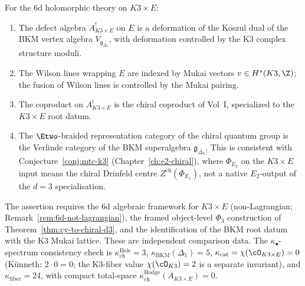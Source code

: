 \begin{conjecture}
\label{conj:chiral-qg-k3xe}
\ClaimStatusConjectured
For the 6d holomorphic theory on $K3 \times E$:
\begin{enumerate}[label=\textup{(\roman*)}]
 \item The defect algebra $A^!_{K3 \times E}$ on $E$ is a deformation of the Koszul dual of the BKM vertex algebra $V_{\mathfrak{g}_{\Delta_5}}$, with deformation controlled by the K3 complex structure moduli.
 \item The Wilson lines wrapping $E$ are indexed by Mukai vectors $v \in H^*(K3, \Z)$; the fusion of Wilson lines is controlled by the Mukai pairing.
 \item The coproduct on $A^!_{K3 \times E}$ is the chiral coproduct of Vol~I, specialized to the $K3 \times E$ root datum.
 \item The $\Etwo$-braided representation category of the chiral quantum group is the Verlinde category of the BKM superalgebra $\mathfrak{g}_{\Delta_5}$. This is consistent with Conjecture~\ref{conj:mtc-k3} (Chapter~\ref{ch:e2-chiral}), where $\Phi_{E_2}$ on the \(K3\times E\) input means the chiral Drinfeld centre \(Z^{\mathrm{ch}}(\Phi_{E_1})\), not a native \(E_2\)-output of the \(d=3\) specialisation.
\end{enumerate}
The assertion requires the 6d algebraic framework for $K3 \times E$ (non-Lagrangian; Remark~\ref{rem:6d-not-lagrangian}), the framed object-level \(\Phi_3\) construction of Theorem~\ref{thm:cy-to-chiral-d3}, and the identification of the BKM root datum with the K3 Mukai lattice. These are independent comparison data. The $\kappa_\bullet$-spectrum consistency check is $\kappa_{\mathrm{ch}}^{\mathrm{Heis}} = 3$, $\kappa_{\mathrm{BKM}}(\Delta_5) = 5$, $\kappa_{\mathrm{cat}} = \chi(\cO_{K3 \times E}) = 0$ (K\"unneth: $2 \cdot 0 = 0$; the K3-fiber value $\chi(\cO_{K3}) = 2$ is a separate invariant), and $\kappa_{\mathrm{fiber}} = 24$, with compact total-space $\kappa_{\mathrm{ch}}^{\mathrm{Hodge}}(A_{K3\times E})=0$.
\end{conjecture}

